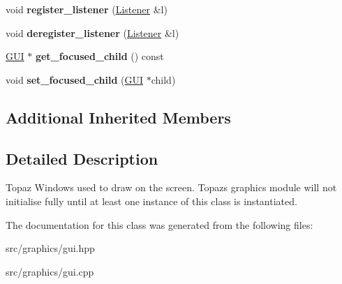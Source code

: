 \begin{DoxyCompactItemize}
\item 
\mbox{\label{class_window_ac5636a14c1078143a869821a07498cd5}} 
void {\bfseries register\+\_\+listener} (\mbox{\hyperlink{class_listener}{Listener}} \&l)
\item 
\mbox{\label{class_window_a184dd18eea525b2d4f85a42e33681951}} 
void {\bfseries deregister\+\_\+listener} (\mbox{\hyperlink{class_listener}{Listener}} \&l)
\item 
\mbox{\label{class_window_af2f8beb54b28dc32d93f6b5f403d2152}} 
\mbox{\hyperlink{class_g_u_i}{G\+UI}} $\ast$ {\bfseries get\+\_\+focused\+\_\+child} () const
\item 
\mbox{\label{class_window_abed0ae68fac68c8d2191d4c7d7a82497}} 
void {\bfseries set\+\_\+focused\+\_\+child} (\mbox{\hyperlink{class_g_u_i}{G\+UI}} $\ast$child)
\end{DoxyCompactItemize}
\subsection*{Additional Inherited Members}


\subsection{Detailed Description}
Topaz Windows used to draw on the screen. Topaz\textquotesingle{}s graphics module will not initialise fully until at least one instance of this class is instantiated. 

The documentation for this class was generated from the following files\+:\begin{DoxyCompactItemize}
\item 
src/graphics/gui.\+hpp\item 
src/graphics/gui.\+cpp\end{DoxyCompactItemize}
